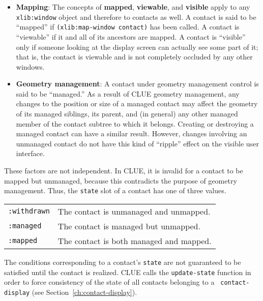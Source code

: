 \documentclass[twoside]{book}
\begin{document}
\begin{sloppy}
\begin{itemize}
\item {\bf Mapping}:
The concepts of {\bf mapped}, {\bf viewable}, and
{\bf visible} apply to any {\tt xlib:window} object and therefore
to contacts as well\cite{x-protocol}.
A contact is said to be ``mapped'' if {\tt (xlib:map-window
contact)} has been called. A contact is ``viewable'' if it and all of its
ancestors are mapped. A contact is ``visible'' only if someone looking at the
display screen can actually see some part of it; that is, the contact is
viewable and is not completely occluded by any other windows.

\item {\bf Geometry management}: A contact under geometry management control is
said to be ``managed.'' As a
result of CLUE geometry management, any changes to the position or size of a
managed contact may affect the geometry of its managed siblings, its parent, and
(in general) any other managed member of the contact subtree to which it
belongs. Creating or destroying a managed contact can have a similar
result. However, changes involving an unmanaged contact
do not have this kind of ``ripple'' effect on the visible user interface. 
\end{itemize}

These factors are not independent. In CLUE, it is invalid for a contact
to be mapped but unmanaged, because this contradicts the purpose of geometry
management\footnotemark{}. Thus, the {\tt state} slot of a
contact has one of three values.

\begin{center}
\begin{tabular}{ll}
{\tt :withdrawn} & The contact is unmanaged and unmapped.\\
 {\tt :managed} & The contact is managed but unmapped.\\
 {\tt :mapped} & The contact is both  managed and mapped.
\end{tabular}
\end{center}


The conditions corresponding to a contact's {\tt state} are not guaranteed to be
satisfied until the contact is realized.
CLUE calls the {\tt update-state} function 
 in
order to force consistency of the state of all contacts belonging to a {\tt
contact-display} (see Section~\ref{ch:contact-display}).


\end{sloppy}
\end{document}
